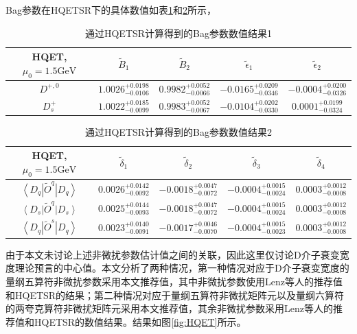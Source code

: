         Bag参数在HQETSR下的具体数值如表\ref{tab:bag_HQETSR}和\ref{tab:bag_HQETSR2}所示，
        \begin{table}
            \scriptsize
            \centering
        \begin{tabular}{|c||c|c|c|c|}
            \hline HQET, $\mu_0=1.5 \mathrm{GeV}$ & $\tilde{B}_1$ & $\tilde{B}_2$ & $\tilde{\epsilon}_1$ & $\tilde{\epsilon}_2$ \\
            \hline$D^{+, 0}$ & $1.0026_{-0.0106}^{+0.0198}$ & $0.9982_{-0.0066}^{+0.0052}$ & $-0.0165_{-0.0346}^{+0.0209}$ & $-0.0004_{-0.0326}^{+0.0200}$ \\
            \hline$D_s^{+}$ & $1.0022_{-0.0099}^{+0.0185}$ & $0.9983_{-0.0067}^{+0.0052}$ & $-0.0104_{-0.0330}^{+0.0202}$ & $0.0001_{-0.0324}^{+0.0199}$ \\
            \hline
            \end{tabular}
            \caption{通过HQETSR计算得到的Bag参数数值结果1}
        \label{tab:bag_HQETSR}
        \end{table}
        \begin{table}
            \scriptsize
            \centering
            \begin{tabular}{|c||c|c|c|c|}
                \hline HQET, $\mu_0=1.5 \mathrm{GeV}$ & $\tilde{\delta}_1$ & $\tilde{\delta}_2$ & $\tilde{\delta}_3$ & $\tilde{\delta}_4$ \\
                \hline$\left\langle D_q\right| \tilde{O}^q\left|D_q\right\rangle$ & $0.0026_{-0.0092}^{+0.0142}$ & $-0.0018_{-0.0072}^{+0.0047}$ & $-0.0004_{-0.0024}^{+0.0015}$ & $0.0003_{-0.0008}^{+0.0012}$ \\
                \hline$\left\langle D_s\right| \tilde{O}^q\left|D_s\right\rangle$ & $0.0025_{-0.0093}^{+0.0144}$ & $-0.0018_{-0.0072}^{+0.0047}$ & $-0.0004_{-0.0024}^{+0.0015}$ & $0.0003_{-0.0008}^{+0.0012}$ \\
                \hline$\left\langle D_q\right| \tilde{O}^s\left|D_q\right\rangle$ & $0.0023_{-0.0091}^{+0.0140}$ & $-0.0017_{-0.0070}^{+0.0046}$ & $-0.0004_{-0.0023}^{+0.0015}$ & $0.0003_{-0.0008}^{+0.0012}$ \\
                \hline
                \end{tabular}
            \caption{通过HQETSR计算得到的Bag参数数值结果2}
            \label{tab:bag_HQETSR2}
        \end{table}
        由于本文未讨论上述非微扰参数估计值之间的关联，因此这里仅讨论D介子衰变宽度理论预言的中心值。本文分析了两种情况，第一种情况对应于D介子衰变宽度的量纲五算符非微扰参数采用本文推荐值，其中非微扰参数使用Lenz等人的推荐值和HQETSR的结果；第二种情况对应于量纲五算符非微扰矩阵元以及量纲六算符的两夸克算符非微扰矩阵元采用本文推荐值，其余非微扰参数采用Lenz等人的推荐值和HQETSR的数值结果。结果如图\ref{fig:HQET}所示。
